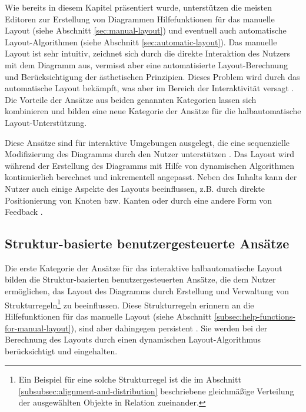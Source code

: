 Wie bereits in diesem Kapitel präsentiert wurde, unterstützen die meisten Editoren zur Erstellung von Diagrammen Hilfefunktionen für das manuelle Layout (siehe Abschnitt \ref{sec:manual-layout}) und eventuell auch automatische Layout-Algorithmen (siehe Abschnitt \ref{sec:automatic-layout}). Das manuelle Layout ist sehr intuitiv, zeichnet sich durch die direkte Interaktion des Nutzers mit dem Diagramm aus, vermisst aber eine automatisierte Layout-Berechnung und Berücksichtigung der ästhetischen Prinzipien. Dieses Problem wird durch das automatische Layout bekämpft, was aber im Bereich der Interaktivität versagt \cite{GladischSchumann14Semi-Automatic}. Die Vorteile der Ansätze aus beiden genannten Kategorien lassen sich kombinieren und bilden eine neue Kategorie der Ansätze für die halbautomatische Layout-Unterstützung.

Diese Ansätze sind für interaktive Umgebungen ausgelegt, die eine sequenzielle Modifizierung des Diagramms durch den Nutzer unterstützen \cite{Arvo02Techniques, GladischSchumann14Semi-Automatic, Wybrow08Using}. Das Layout wird während der Erstellung des Diagramms mit Hilfe von dynamischen Algorithmen kontinuierlich berechnet und inkrementell angepasst. Neben des Inhalts kann der Nutzer auch einige Aspekte des Layouts beeinflussen, z.B. durch direkte Positionierung von Knoten bzw. Kanten oder durch eine andere Form von Feedback \cite{Arvo02Techniques}.

\subsection{Struktur-basierte benutzergesteuerte Ansätze}
\label{subsec:structure-based-user-controlled-approaches}

Die erste Kategorie der Ansätze für das interaktive halbautomatische Layout bilden die Struktur-basierten benutzergesteuerten Ansätze, die dem Nutzer ermöglichen, das Layout des Diagramms durch Erstellung und Verwaltung von Strukturregeln\footnote{Ein Beispiel für eine solche Strukturregel ist die im Abschnitt \ref{subsubsec:alignment-and-distribution} beschriebene gleichmäßige Verteilung der ausgewählten Objekte in Relation zueinander.} zu beeinflussen. Diese Strukturregeln erinnern an die Hilfefunktionen für das manuelle Layout (siehe Abschnitt \ref{subsec:help-functions-for-manual-layout}), sind aber dahingegen persistent \cite{Wybrow08Using}. Sie werden bei der Berechnung des Layouts durch einen dynamischen Layout-Algorithmus berücksichtigt und eingehalten.

